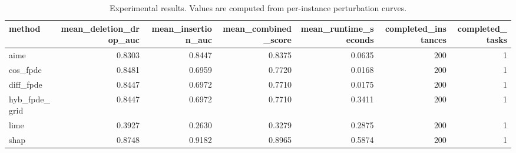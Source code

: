 \begin{table}[t]
\caption{Experimental results. Values are computed from per-instance perturbation curves.}
\label{tab:main_results_computed}
\centering
\begin{tabular}{lrrrrrr}
\toprule
method & mean\_deletion\_drop\_auc & mean\_insertion\_auc & mean\_combined\_score & mean\_runtime\_seconds & completed\_instances & completed\_tasks \\
\midrule
aime & 0.8303 & 0.8447 & 0.8375 & 0.0635 & 200 & 1 \\
cos\_fpde & 0.8481 & 0.6959 & 0.7720 & 0.0168 & 200 & 1 \\
diff\_fpde & 0.8447 & 0.6972 & 0.7710 & 0.0175 & 200 & 1 \\
hyb\_fpde\_grid & 0.8447 & 0.6972 & 0.7710 & 0.3411 & 200 & 1 \\
lime & 0.3927 & 0.2630 & 0.3279 & 0.2875 & 200 & 1 \\
shap & 0.8748 & 0.9182 & 0.8965 & 0.5874 & 200 & 1 \\
\bottomrule
\end{tabular}

\end{table}
